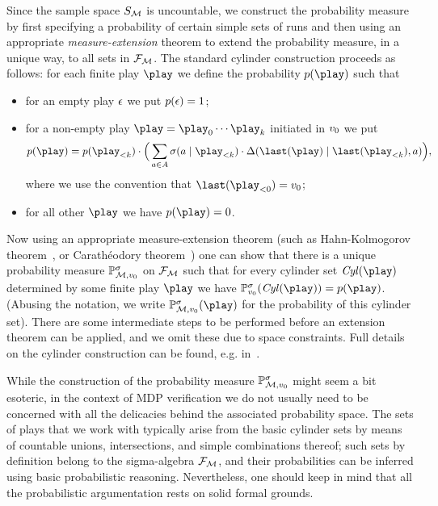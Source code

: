Since the sample space $S_{\mathcal{M}}$ is uncountable, we construct the 
probability measure by first specifying a probability of certain simple sets of 
runs and then using an appropriate \emph{measure-extension} theorem to extend 
the probability measure, in a unique way, to all sets in $\mathcal{F}_{\mathcal{M}}$.
The standard cylinder construction  
proceeds as follows: for each finite play $\play$ we define the probability 
$\cylProb(\play)$ such that

\begin{itemize}
\item for an empty play $\epsilon$ we put $p(\epsilon)=1$;
\item for a non-empty play $\play=\play_0\cdots \play_{k}$ initiated in 
$v_0$ we put 
\[\cylProb(\play) = \cylProb(\play_{< k})\cdot \Big(\sum_{a \in \actions} 
\sigma(a\mid \play_{< k})\cdot \probTranFunc(\last(\play)\mid 
\last(\play_{< k}),a) 
\Big), \]
where we use the convention that $\last(\play_{< 0})=\vinit$;
\item for all other $\play$ we have $\cylProb(\play)=0$.
\end{itemize}

Now using an appropriate measure-extension theorem
(such as Hahn-Kol\-mo\-go\-rov theorem~\cite[Corollary 2.5.4 and Proposition  2.5.7]{Rosenthal:2006}, or Carath\'eodory theorem~\cite[Theorem 1.3.10]{Ash&Doleans-Dade:2000}) one can show that there is a 
unique probability 
measure $\mathbb{P}^{\sigma}_{\mathcal{M},v_0} $ on $\mathcal{F}_{\mathcal{M}}$ such that for 
every cylinder set $\cylinder(\play)$ determined by some finite play $\play$ we have $\probm_{\vinit}^\sigma(\cylinder(\play))=\cylProb(\play)$. (Abusing the notation, we write $\probm^{\sigma}_{\mdp,\vinit}(\play)$ for the probability of this cylinder set). There 
are some intermediate steps to be performed before an extension theorem 
can be applied, and we omit these due to space constraints. Full details on the 
cylinder construction can be found, e.g. in~\cite{Ash&Doleans-Dade:2000,Novotny:2015}.

While the construction of the probability measure 
$\mathbb{P}^{\sigma}_{\mathcal{M},v_0}$ might seem a bit esoteric, in the context of 
MDP verification we do not usually need to be concerned with all the delicacies 
behind the associated probability space. The sets of plays that we work with 
typically arise from the basic cylinder sets by means of countable unions, 
intersections, and simple combinations thereof; such sets by definition belong 
to the 
sigma-algebra $\mathcal{F}_{\mathcal{M}}$, and their probabilities can be inferred using 
basic probabilistic reasoning. Nevertheless, one should keep in mind that all the 
probabilistic argumentation rests on solid formal grounds. 

